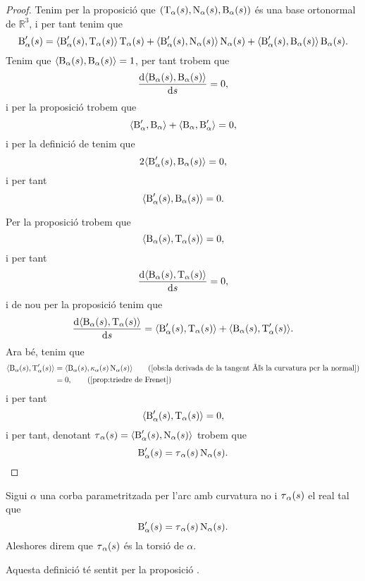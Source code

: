 \documentclass[../Apunts.tex]{subfiles}
\begin{document}
	\begin{proof}
		Tenim per la proposició  que \((\operatorname{T}_{\alpha}(s),\operatorname{N}_{\alpha}(s),\operatorname{B}_{\alpha}(s))\) és una base ortonormal de \(\mathbb{R}^{3}\), i per tant tenim que %
		\[\binormal'_{\alpha}(s)=\prodesc{\binormal'_{\alpha}(s)}{\tangent_{\alpha}(s)}\tangent_{\alpha}(s)+\prodesc{\binormal'_{\alpha}(s)}{\normal_{\alpha}(s)}\normal_{\alpha}(s)+\prodesc{\binormal'_{\alpha}(s)}{\binormal_{\alpha}(s)}\binormal_{\alpha}(s).\]
		Tenim que \(\prodesc{\binormal_{\alpha}(s)}{\binormal_{\alpha}(s)}=1\), per tant trobem que
		\[\frac{\diff\prodesc{\binormal_{\alpha}(s)}{\binormal_{\alpha}(s)}}{\diff s}=0,\]
		i per la proposició  trobem que
		\[\prodesc{\binormal'_{\alpha}}{\binormal_{\alpha}}+\prodesc{\binormal_{\alpha}}{\binormal'_{\alpha}}=0,\]
		i per la definició de  tenim que
		\[2\prodesc{\binormal'_{\alpha}(s)}{\binormal_{\alpha}(s)}=0,\]
		i per tant
		\[\prodesc{\binormal'_{\alpha}(s)}{\binormal_{\alpha}(s)}=0.\]
		
		Per la proposició  trobem que
		\[\prodesc{\binormal_{\alpha}(s)}{\tangent_{\alpha}(s)}=0,\]
		i per tant
		\[\frac{\diff\prodesc{\binormal_{\alpha}(s)}{\tangent_{\alpha}(s)}}{\diff s}=0,\]
		i de nou per la proposició  tenim que
		\[\frac{\diff\prodesc{\binormal_{\alpha}(s)}{\tangent_{\alpha}(s)}}{\diff s}=\prodesc{\binormal'_{\alpha}(s)}{\tangent_{\alpha}(s)}+\prodesc{\binormal_{\alpha}(s)}{\tangent'_{\alpha}(s)}.\]
		Ara bé, tenim que
		\begin{align*}
			\prodesc{\binormal_{\alpha}(s)}{\tangent'_{\alpha}(s)}&=\prodesc{\binormal_{\alpha}(s)}{\curvatura_{\alpha}(s)\normal_{\alpha}(s)} \tag{\ref{obs:la derivada de la tangent és la curvatura per la normal}} \\
			&=0, \tag{\ref{prop:triedre de Frenet}}
		\end{align*}
		i per tant
		\[\prodesc{\binormal'_{\alpha}(s)}{\tangent_{\alpha}(s)}=0,\]
		i per tant, denotant \(\torsio_{\alpha}(s)=\prodesc{\binormal'_{\alpha}(s)}{\normal_{\alpha}(s)}\) trobem que
		\[\operatorname{B}'_{\alpha}(s)=\operatorname{\tau}_{\alpha}(s)\operatorname{N}_{\alpha}(s).\qedhere\]
	\end{proof}
	\begin{definition}[Torsió]
		\label{def:torsió}
		Sigui \(\alpha\) una corba parametritzada per l'arc amb curvatura no \nulla{} i \(\operatorname{\tau}_{\alpha}(s)\) el real tal que
		\[\operatorname{B}'_{\alpha}(s)=\operatorname{\tau}_{\alpha}(s)\operatorname{N}_{\alpha}(s).\]
		Aleshores direm que \(\operatorname{\tau}_{\alpha}(s)\) és la torsió de \(\alpha\).
		
		Aquesta definició té sentit per la proposició .
	\end{definition}
\end{document}
